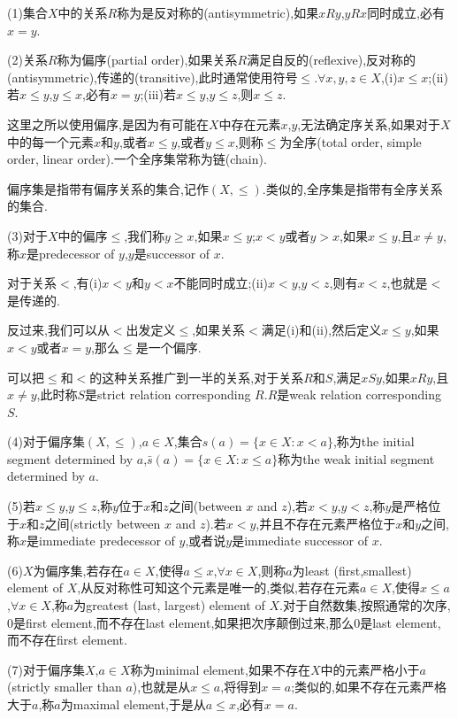 \documentclass[12pt,a4paper,openany]{book}
\begin{document}
(1)集合$X$中的关系$R$称为是反对称的(antisymmetric),如果$xRy$,$yRx$同时成立,必有$x=y$.

(2)关系$R$称为偏序(partial order),如果关系$R$满足自反的(reflexive),反对称的(antisymmetric),传递的(transitive),此时通常使用符号$\le$.$\forall x,y,z \in X$,(i)$x \le x$;(ii)若$x \le y$,$y \le x$,必有$x=y$;(iii)若$x \le y$,$y \le z$,则$x \le z$.

这里之所以使用偏序,是因为有可能在$X$中存在元素$x$,$y$,无法确定序关系,如果对于$X$中的每一个元素$x$和$y$,或者$x \le y$,或者$y \le x$,则称$\le$为全序(total order, simple order, linear order).一个全序集常称为链(chain).

偏序集是指带有偏序关系的集合,记作$(X, \le)$.类似的,全序集是指带有全序关系的集合.

(3)对于$X$中的偏序$\le$,我们称$y \ge x$,如果$x \le y$;$x < y$或者$y>x$,如果$x \le y$,且$x \neq y$,称$x$是predecessor of $y$,$y$是successor of $x$.

对于关系$<$,有(i)$x<y$和$y<x$不能同时成立;(ii)$x<y$,$y<z$,则有$x<z$,也就是$<$是传递的.

反过来,我们可以从$<$出发定义$\le$,如果关系$<$满足(i)和(ii),然后定义$x \le y$,如果$x<y$或者$x=y$,那么$\le$是一个偏序.

可以把$\le$和$<$的这种关系推广到一半的关系,对于关系$R$和$S$,满足$xSy$,如果$xRy$,且$x \neq y$,此时称$S$是strict relation corresponding $R$.$R$是weak relation corresponding $S$.

(4)对于偏序集$(X, \le)$,$a \in X$,集合$s(a)=\{x \in X: x < a\}$,称为the initial segment determined by $a$,$\bar{s}(a)=\{x \in X: x \le a\}$称为the weak initial segment determined by $a$.

(5)若$x \le y$,$y \le z$,称$y$位于$x$和$z$之间(between $x$ and $z$),若$x<y$,$y<z$,称$y$是严格位于$x$和$z$之间(strictly between $x$ and $z$).若$x<y$,并且不存在元素严格位于$x$和$y$之间,称$x$是immediate predecessor of $y$,或者说$y$是immediate successor of $x$.

(6)$X$为偏序集,若存在$a \in X$,使得$a \le x$,$\forall x \in X$,则称$a$为least (first,smallest) element of $X$,从反对称性可知这个元素是唯一的,类似,若存在元素$a \in X$,使得$x \le a$,$\forall x \in X$,称$a$为greatest (last, largest) element of $X$.对于自然数集,按照通常的次序,$0$是first element,而不存在last element,如果把次序颠倒过来,那么$0$是last element,而不存在first element.

(7)对于偏序集$X$,$a \in X$称为minimal element,如果不存在$X$中的元素严格小于$a$ (strictly smaller than $a$),也就是从$x \le a$,将得到$x=a$;类似的,如果不存在元素严格大于$a$,称$a$为maximal element,于是从$a \le x$,必有$x=a$.
\end{document}
